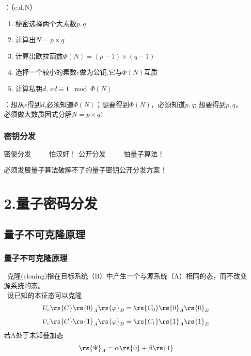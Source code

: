 \begin{frame}
    \frametitle{}
    {\color{red}{制备}}：（e,d,N）
    \begin{enumerate}
        \item 秘密选择两个大素数$p,q$
        \item 计算出$N=p\times q$
        \item 计算出欧拉函数$\Phi(N)=(p-1)\times (q-1)$
        \item 选择一个较小的素数$e$做为公钥,它与$\Phi(N)$互质
        \item 计算私钥$d$, $ed\equiv 1 \mod \Phi(N)$
    \end{enumerate}
     {\color{red}{破解}}：想从$e$得到$d$,必须知道$\Phi(N)$；想要得到$\Phi(N)$，必须知道$p,q$; 想要得到$p,q$，必须做大数质因式分解$N=p \times q$!
\end{frame}


\begin{frame}
    \frametitle{密钥分发}
    \begin{itemize}
        \Item 密使分发 $\qquad$ 怕汉奸！
        \Item 公开分发 $\qquad$ 怕量子算法！
    \end{itemize}
    必须发展量子算法破解不了的量子密钥公开分发方案！
\end{frame}

\section{2.量子密码分发}
\subsection{量子不可克隆原理}
\begin{frame}
    \frametitle{量子不可克隆原理}
    {\Bullet}~克隆(cloning)指在目标系统（B）中产生一个与源系统（A）相同的态，而不改变源系统的态。\\ \vspace{1em}
    \例[1.试证明未知量子态不可克隆]{}
    \证~设已知的本征态可以克隆
    \[ U_c\rs{C}\rs{0}_A\rs{\varphi}_B=\rs{C_0}\rs{0}_A\rs{0}_B\]
    \[ U_c\rs{C}\rs{1}_A\rs{\varphi}_B=\rs{C_1}\rs{1}_A\rs{1}_B\]
    若A处于未知叠加态\[ \rs{\Psi}_A=\alpha\rs{0}+\beta\rs{1}\]
\end{frame}

